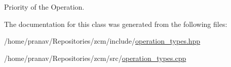 Priority of the Operation. 



The documentation for this class was generated from the following files\+:\begin{DoxyCompactItemize}
\item 
/home/pranav/\+Repositories/zcm/include/\hyperlink{operation__types_8hpp}{operation\+\_\+types.\+hpp}\item 
/home/pranav/\+Repositories/zcm/src/\hyperlink{operation__types_8cpp}{operation\+\_\+types.\+cpp}\end{DoxyCompactItemize}

